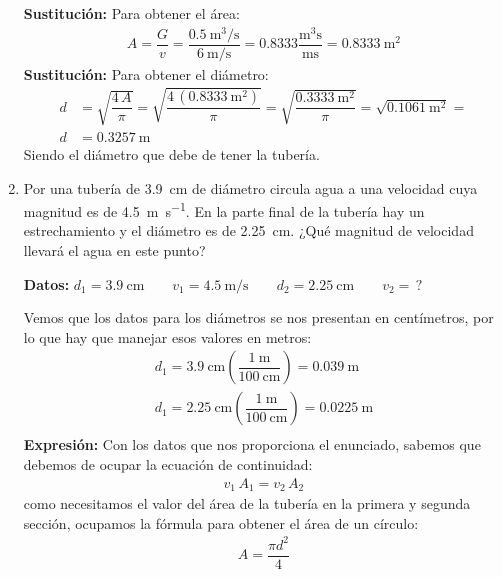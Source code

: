 \documentclass[14pt]{extarticle}
\begin{document}
\begin{enumerate}
\textbf{Sustitución:} Para obtener el área:
\begin{align*}
A = \dfrac{G}{v} = \dfrac{\displaystyle \SI[per-mode=fraction]{0.5}{\cubic\meter\per\second}}{\displaystyle \SI[per-mode=fraction]{6}{\meter\per\second}} = \num{0.8333} \dfrac{\unit{\cubic\meter\second}}{\unit{\meter\second}} = \SI{0.8333}{\square\meter}
\end{align*}
\textbf{Sustitución:} Para obtener el diámetro:
\begin{align*}
d &= \sqrt{ \dfrac{4 \, A}{\pi}} = \sqrt{\dfrac{4 \, \left( \SI{0.8333}{\square\meter} \right) }{\pi}} = \sqrt{\dfrac{\SI{0.3333}{\square\meter}}{\pi}} = \sqrt{\SI{0.1061}{\square\meter}} = \\[0.5em]
d &= \SI{0.3257}{\meter}
\end{align*}
Siendo el diámetro que debe de tener la tubería.
\item Por una tubería de \SI{3.9}{\centi\meter} de diámetro circula agua a una velocidad cuya magnitud es de \SI{4.5}{\meter\per\second}. En la parte final de la tubería hay un estrechamiento y el diámetro es de \SI{2.25}{\centi\meter}. ¿Qué magnitud de velocidad llevará el agua en este punto?

\textbf{Datos:} $d_{1} = \SI{3.9}{\centi\meter} \quad \quad v_{1} = \SI{4.5}{\meter\per\second} \quad \quad d_{2} = \SI{2.25}{\centi\meter} \quad \quad v_{2} = \, ?$

Vemos que los datos para los diámetros se nos presentan en centímetros, por lo que hay que manejar esos valores en metros:
\begin{align*}
d_{1} = \SI{3.9}{\centi\meter} \left( \dfrac{\SI{1}{\meter}}{\SI{100}{\centi\meter}} \right) = \SI{0.039}{\meter} \\[0.5em]
d_{1} = \SI{2.25}{\centi\meter} \left( \dfrac{\SI{1}{\meter}}{\SI{100}{\centi\meter}} \right) = \SI{0.0225}{\meter} \\
\end{align*}
\textbf{Expresión:} Con los datos que nos proporciona el enunciado, sabemos que debemos de ocupar la ecuación de continuidad:
\begin{align*}
v_{1} \, A_{1} = v_{2} \, A_{2}
\end{align*}
como necesitamos el valor del área de la tubería en la primera y segunda sección, ocupamos la fórmula para obtener el área de un círculo:
\begin{align*}
A = \dfrac{\pi d^{2}}{4}
\end{align*}


\end{enumerate}
\end{document}
